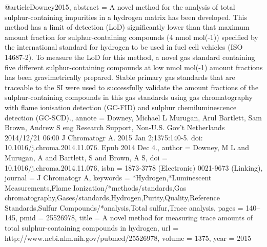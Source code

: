 @article{Downey2015,
abstract = {A novel method for the analysis of total sulphur-containing impurities in a hydrogen matrix has been developed. This method has a limit of detection (LoD) significantly lower than that maximum amount fraction for sulphur-containing compounds (4 nmol mol(-1)) specified by the international standard for hydrogen to be used in fuel cell vehicles (ISO 14687-2). To measure the LoD for this method, a novel gas standard containing five different sulphur-containing compounds at low nmol mol(-1) amount fractions has been gravimetrically prepared. Stable primary gas standards that are traceable to the SI were used to successfully validate the amount fractions of the sulphur-containing compounds in this gas standards using gas chromatography with flame ionisation detection (GC-FID) and sulphur chemiluminescence detection (GC-SCD).},
annote = {Downey, Michael L
Murugan, Arul
Bartlett, Sam
Brown, Andrew S
eng
Research Support, Non-U.S. Gov't
Netherlands
2014/12/21 06:00
J Chromatogr A. 2015 Jan 2;1375:140-5. doi: 10.1016/j.chroma.2014.11.076. Epub 2014 Dec 4.},
author = {Downey, M L and Murugan, A and Bartlett, S and Brown, A S},
doi = {10.1016/j.chroma.2014.11.076},
isbn = {1873-3778 (Electronic)
0021-9673 (Linking)},
journal = {J Chromatogr A},
keywords = {*Hydrogen,*Luminescent Measurements,Flame Ionization/*methods/standards,Gas chromatography,Gases/standards,Hydrogen,Purity,Quality,Reference Standards,Sulfur Compounds/*analysis,Total sulfur,Trace analysis},
pages = {140--145},
pmid = {25526978},
title = {{A novel method for measuring trace amounts of total sulphur-containing compounds in hydrogen}},
url = {http://www.ncbi.nlm.nih.gov/pubmed/25526978},
volume = {1375},
year = {2015}
}
